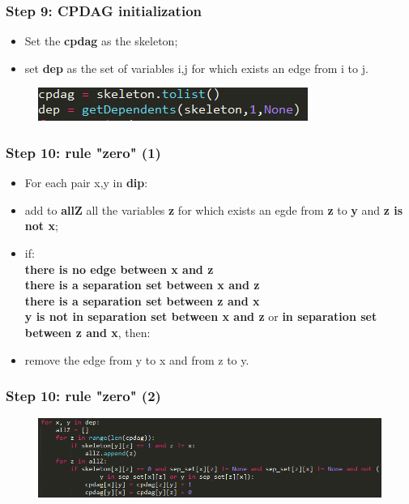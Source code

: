 \documentclass[xcolor ={table,usenames,dvipsnames}]{beamer}
\theoremstyle{definition}
\begin{document}
\begin{frame}
\frametitle{Step 9: CPDAG initialization}
\begin{itemize}
	\item Set the \textbf{cpdag} as the skeleton;
	\item set \textbf{dep} as the set of variables i,j for which exists an edge from i to j.
\end{itemize}
	\begin{figure}[h!]
		\centering
		\includegraphics[scale=0.8]{img/cpdaginit.PNG}
		\label{Interfacce di un CS}
	\end{figure}
\end{frame}
\begin{frame}
\frametitle{Step 10: rule "zero" (1)}
\begin{itemize}
	\item For each pair x,y in \textbf{dip}:
	\item add to \textbf{allZ} all the variables \textbf{z} for which exists an egde from \textbf{z} to \textbf{y} and \textbf{z is not x};
	\item if:\\\textbf{there is no edge between x and z}\\ \textbf{there is a separation set between x and z}\\\textbf{there is a separation set between z and x}\\\textbf{y is not in separation set between x and z} or \textbf{in separation set between z and x}, then:
	\item remove the edge from y to x and from z to y.
\end{itemize}
\end{frame}
\begin{frame}
\frametitle{Step 10: rule "zero" (2)}
	\begin{figure}[h!]
		\centering
		\includegraphics[scale=0.52]{img/rulezero.PNG}
		\label{Interfacce di un CS}
	\end{figure}
\end{frame}
\end{document}
